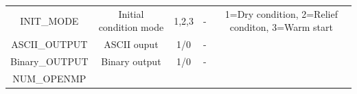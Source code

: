 \documentclass[]{scrbook}
\begin{document}
\begin{longtable}[]{@{}ccccc@{}}
\begin{minipage}[t]{0.17\columnwidth}
INIT\_MODE\strut
\end{minipage} & \begin{minipage}[t]{0.23\columnwidth}\centering\strut
Initial condition mode\strut
\end{minipage} & \begin{minipage}[t]{0.10\columnwidth}\centering\strut
1,2,3\strut
\end{minipage} & \begin{minipage}[t]{0.10\columnwidth}\centering\strut
-\strut
\end{minipage} & \begin{minipage}[t]{0.26\columnwidth}\centering\strut
1=Dry condition, 2=Relief conditon, 3=Warm start\strut
\end{minipage}\tabularnewline
\begin{minipage}[t]{0.17\columnwidth}\centering\strut
ASCII\_OUTPUT\strut
\end{minipage} & \begin{minipage}[t]{0.23\columnwidth}\centering\strut
ASCII ouput\strut
\end{minipage} & \begin{minipage}[t]{0.10\columnwidth}\centering\strut
1/0\strut
\end{minipage} & \begin{minipage}[t]{0.10\columnwidth}\centering\strut
-\strut
\end{minipage} & \begin{minipage}[t]{0.26\columnwidth}\centering\strut
\strut
\end{minipage}\tabularnewline
\begin{minipage}[t]{0.17\columnwidth}\centering\strut
Binary\_OUTPUT\strut
\end{minipage} & \begin{minipage}[t]{0.23\columnwidth}\centering\strut
Binary output\strut
\end{minipage} & \begin{minipage}[t]{0.10\columnwidth}\centering\strut
1/0\strut
\end{minipage} & \begin{minipage}[t]{0.10\columnwidth}\centering\strut
-\strut
\end{minipage} & \begin{minipage}[t]{0.26\columnwidth}\centering\strut
\strut
\end{minipage}\tabularnewline
\begin{minipage}[t]{0.17\columnwidth}\centering\strut
NUM\_OPENMP\strut
\end{minipage} & \begin{minipage}[t]{0.23\columnwidth}\centering\strut

\end{minipage}
\end{longtable}
\end{document}

